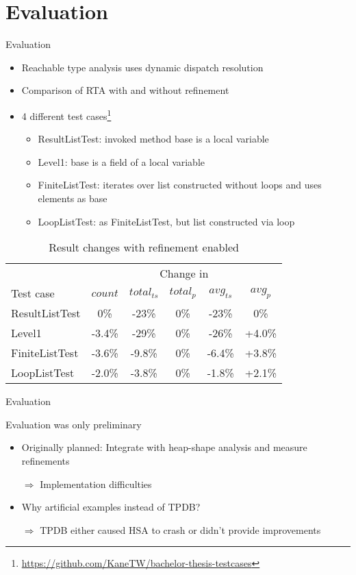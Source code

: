 \documentclass{beamer}
\begin{document}
\section{Evaluation}
\begin{frame}[allowframebreaks]{Evaluation}
\begin{itemize}
\item Reachable type analysis uses dynamic dispatch resolution
\item Comparison of RTA with and without refinement
\item 4 different test cases\footnote{\url{https://github.com/KaneTW/bachelor-thesis-testcases}}
\begin{itemize}
\item ResultListTest: invoked method base is a local variable
\item Level1: base is a field of a local variable
\item FiniteListTest: iterates over list constructed without loops and uses elements as base
\item LoopListTest: as FiniteListTest, but list constructed via loop
\end{itemize}
\end{itemize}
\begin{table}[ht]
    \centering
    \begin{tabular}{l||c|c|c|c|c}
     & \multicolumn{5}{c}{Change in }\\
         Test case & $\mathit{count}$ & $\mathit{total}_\mathit{ts}$ &  $\mathit{total}_\mathit{p}$ & $\mathit{avg}_{\mathit{ts}}$ & $\mathit{avg}_{\mathit{p}}$ \\
         \hline
         ResultListTest & 0\% & -23\% & 0\% & -23\% & 0\% \\
         Level1 & -3.4\% & -29\% & 0\% & -26\% & +4.0\% \\
         FiniteListTest & -3.6\% & -9.8\% & 0\% & -6.4\% & +3.8\% \\
         LoopListTest & -2.0\% & -3.8\% & 0\% & -1.8\% & +2.1\% 
    \end{tabular}
    \caption{Result changes with refinement enabled}
    \label{tab:changes}
\end{table}
\end{frame}
\begin{frame}{Evaluation}
\begin{block}{Evaluation was only preliminary}
\begin{itemize}
    \item Originally planned: Integrate with heap-shape analysis and measure refinements
    \item[$\Rightarrow$] Implementation difficulties
    \item Why artificial examples instead of TPDB?
    \item[$\Rightarrow$] TPDB either caused HSA to crash or didn't provide improvements
\end{itemize}
\end{block}
\end{frame}
\end{document}
